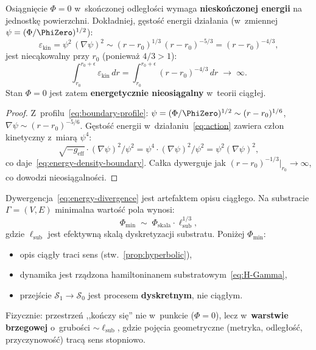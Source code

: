 \begin{proposition}\label{prop:energy-barrier}
Osi\k{a}gni\k{e}cie $\Phi = 0$ w~sko\'nczonej odleg\l{}o\'sci
wymaga \textbf{niesko\'nczonej energii} na jednostk\k{e}
powierzchni. Dok\l{}adniej, g\k{e}sto\'s\'c energii
dzia\l{}ania (w~zmiennej $\psi = (\Phi/\PhiZero)^{1/2}$):
\begin{equation}\label{eq:energy-density-boundary}
    \varepsilon_{\mathrm{kin}}
    = \psi^2\,(\nabla\psi)^2
    \sim (r-r_0)^{1/3}\,(r-r_0)^{-5/3}
    = (r - r_0)^{-4/3},
\end{equation}
jest niec\k{a}kowalny przy $r_0$ (poniewa\.z $4/3 > 1$):
\begin{equation}\label{eq:energy-divergence}
    \int_{r_0}^{r_0+\epsilon}
      \varepsilon_{\mathrm{kin}}\,dr
    = \int_{r_0}^{r_0+\epsilon}
      (r - r_0)^{-4/3}\,dr
    \;\to\; \infty.
\end{equation}
Stan $\Phi = 0$ jest zatem \textbf{energetycznie
nieosi\k{a}galny} w~teorii ci\k{a}g\l{}ej.
\end{proposition}

\begin{proof}
Z~profilu~\eqref{eq:boundary-profile}: $\psi =
(\Phi/\PhiZero)^{1/2} \sim (r-r_0)^{1/6}$,
$\nabla\psi \sim (r-r_0)^{-5/6}$.
G\k{e}sto\'s\'c energii w~dzia\l{}aniu~\eqref{eq:action}
zawiera cz\l{}on kinetyczny z~miar\k{a} $\psi^4$:
\[
    \sqrt{-g_{\mathrm{eff}}}\cdot(\nabla\psi)^2/\psi^2
    = \psi^4 \cdot (\nabla\psi)^2/\psi^2
    = \psi^2(\nabla\psi)^2,
\]
co daje~\eqref{eq:energy-density-boundary}.
Ca\l{}ka dywerguje jak $(r-r_0)^{-1/3}\big|_{r_0}
\to \infty$, co dowodzi nieosi\k{a}galno\'sci.
\end{proof}

\begin{corollary}\label{cor:substrate-cutoff}
Dywergencja~\eqref{eq:energy-divergence} jest artefaktem
opisu ci\k{a}g\l{}ego. Na substracie $\Gamma = (V, E)$
minimalna warto\'s\'c pola wynosi:
\begin{equation}\label{eq:Phi-min}
    \Phi_{\min} \;\sim\; \Phi_{\mathrm{skala}}
    \cdot \ell_{\mathrm{sub}}^{1/3},
\end{equation}
gdzie $\ell_{\mathrm{sub}}$ jest efektywn\k{a} skal\k{a}
dyskretyzacji substratu. Poni\.zej $\Phi_{\min}$:
\begin{itemize}[nosep]
  \item opis ci\k{a}g\l{}y traci sens
    (stw.~\ref{prop:hyperbolic}),
  \item dynamika jest rz\k{a}dzona hamiltoninanem
    substratowym~\eqref{eq:H-Gamma},
  \item przej\'scie $\mathcal{S}_1 \to \mathcal{S}_0$ jest
    procesem \textbf{dyskretnym}, nie ci\k{a}g\l{}ym.
\end{itemize}
Fizycznie: przestrze\'n ,,ko\'nczy si\k{e}'' nie w~punkcie
($\Phi = 0$), lecz w~\textbf{warstwie brzegowej} o~grubo\'sci
$\sim \ell_{\mathrm{sub}}$, gdzie poj\k{e}cia geometryczne
(metryka, odleg\l{}o\'s\'c, przyczynowo\'s\'c) trac\k{a}
sens stopniowo.
\end{corollary}


